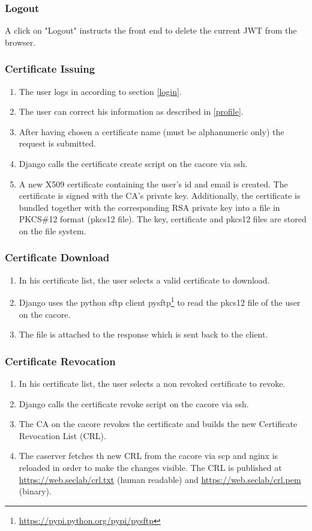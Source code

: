 \documentclass[english]{article}
\begin{document}
 \subsubsection{Logout}
 A click on "Logout" instructs the front end to delete the current JWT from the browser.
 
 \subsubsection{Certificate Issuing}
 \begin{enumerate}
 \item The user logs in according to section \ref{login}.
 \item The user can correct his information as described in \ref{profile}.
 \item After having chosen a certificate name (must be alphanumeric only) the request is submitted.
 \item Django calls the certificate create script on the cacore via ssh.
 \item A new X509 certificate containing the user's id and email is created. The certificate is signed with the CA's private key. Additionally, the certificate is bundled together with the corresponding RSA private key into a file in PKCS\#12 format (pkcs12 file). The key, certificate and pkcs12 files are stored on the file system.
 \end{enumerate}
 
 \subsubsection{Certificate Download}
\begin{enumerate}
\item In his certificate list, the user selects a valid certificate to download. 
\item Django uses the python sftp client pysftp\footnote{\label{pysftp}\url{https://pypi.python.org/pypi/pysftp}} to read the pkcs12 file of the user on the cacore. 
\item The file is attached to the response which is sent back to the client.
\end{enumerate} 
 
 \subsubsection{Certificate Revocation}
 \begin{enumerate}
 \item In his certificate list, the user selects a non revoked certificate to revoke. 
 \item Django calls the certificate revoke script on the cacore via ssh.
 \item The CA on the cacore revokes the certificate and builds the new Certificate Revocation List (CRL).
 \item The caserver fetches th new CRL from the cacore via scp and nginx is reloaded in order to make the changes visible. The CRL is published at \url{https://web.seclab/crl.txt} (human readable) and \url{https://web.seclab/crl.pem} (binary).
 \end{enumerate}
 
\end{document}
